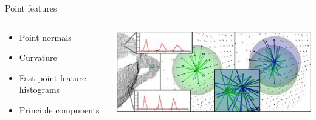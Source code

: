 \documentclass{beamer}
\begin{document}
\begin{frame}{Point features}

\begin{columns}[T]
\begin{column}{0.5\textwidth}

\begin{itemize}
\item Point normals
\item Curvature
\item Fast point feature histograms
\item Principle components
\end{itemize}

\end{column}

\begin{column}{0.5\textwidth}

\includegraphics[width=1\textwidth]{pics/features.png}

\end{column}

\end{columns}

\end{frame}
\end{document}
